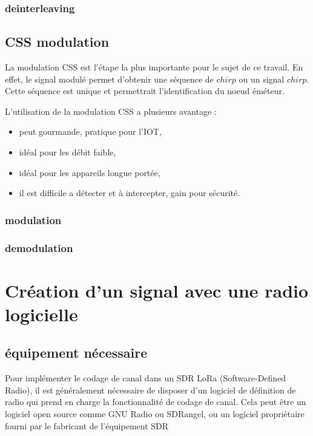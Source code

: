 \documentclass[12pt,a4paper,oneside, titlepage]{report}
\begin{document}
\subsection{deinterleaving}

\section{CSS modulation}

La modulation CSS est l'étape la plus importante pour le sujet de ce travail. En effet, le signal modulé permet d'obtenir une séquence de $chirp$ ou un signal $chirp$. Cette séquence est unique et permettrait l'identification du noeud éméteur. 

L'utilisation de la modulation CSS a plusieurs avantage :

\begin{itemize}
\item peut gourmande, pratique pour l'IOT,
\item idéal pour les débit faible,
\item idéal pour les appareils longue portée,
\item il est difficile a détecter et à intercepter, gain pour sécurité.
\end{itemize}

\subsection{modulation}

\subsection{demodulation}

\chapter{Création d'un signal avec une radio logicielle}
\renewcommand{\leftmark}{CHAPITRE \thechapter.~~Titre Expérimentation de LoRa sur un SDR}

\section{équipement nécessaire}

Pour implémenter le codage de canal dans un SDR LoRa (Software-Defined Radio), il est généralement nécessaire de disposer d'un logiciel de définition de radio qui prend en charge la fonctionnalité de codage de canal. Cela peut être un logiciel open source comme GNU Radio ou SDRangel, ou un logiciel propriétaire fourni par le fabricant de l'équipement SDR
\end{document}

